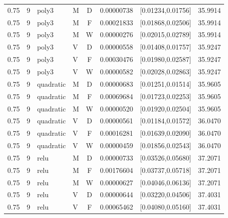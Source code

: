 \begin{longtable}{rrllcrrr}
0.75 & 9 & poly3 & M & D & 0.00000738 & [0.01234,0.01756] & 35.9914 \\

0.75 & 9 & poly3 & M & F & 0.00021833 & [0.01868,0.02506] & 35.9914 \\

0.75 & 9 & poly3 & M & W & 0.00000276 & [0.02015,0.02789] & 35.9914 \\

0.75 & 9 & poly3 & V & D & 0.00000558 & [0.01408,0.01757] & 35.9247 \\

0.75 & 9 & poly3 & V & F & 0.00030476 & [0.01980,0.02587] & 35.9247 \\

0.75 & 9 & poly3 & V & W & 0.00000582 & [0.02028,0.02863] & 35.9247 \\

0.75 & 9 & quadratic & M & D & 0.00000683 & [0.01251,0.01514] & 35.9605 \\

0.75 & 9 & quadratic & M & F & 0.00069684 & [0.01723,0.02253] & 35.9605 \\

0.75 & 9 & quadratic & M & W & 0.00000520 & [0.01920,0.02504] & 35.9605 \\

0.75 & 9 & quadratic & V & D & 0.00000561 & [0.01184,0.01572] & 36.0470 \\

0.75 & 9 & quadratic & V & F & 0.00016281 & [0.01639,0.02090] & 36.0470 \\

0.75 & 9 & quadratic & V & W & 0.00000459 & [0.01856,0.02543] & 36.0470 \\

0.75 & 9 & relu & M & D & 0.00000733 & [0.03526,0.05680] & 37.2071 \\

0.75 & 9 & relu & M & F & 0.00176604 & [0.03737,0.05718] & 37.2071 \\

0.75 & 9 & relu & M & W & 0.00000627 & [0.04046,0.06136] & 37.2071 \\

0.75 & 9 & relu & V & D & 0.00000644 & [0.03220,0.04506] & 37.4031 \\

0.75 & 9 & relu & V & F & 0.00065462 & [0.04080,0.05160] & 37.4031 \\


\end{longtable}
